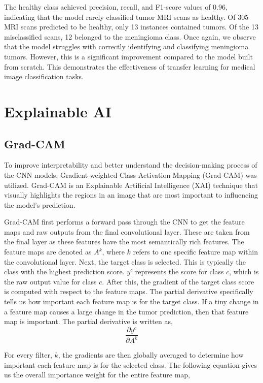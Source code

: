 \documentclass[conference]{IEEEtran}
\begin{document}
The healthy class achieved precision, recall, and F1-score values of 0.96, indicating that the model rarely classified tumor MRI scans as healthy. Of 305 MRI scans predicted to be healthy, only 13 instances contained tumors. Of the 13 misclassified scans, 12 belonged to the meningioma class. Once again, we observe that the model struggles with correctly identifying and classifying meningioma tumors. However, this is a significant improvement compared to the model built from scratch. This demonstrates the effectiveness of transfer learning for medical image classification tasks.

\section{Explainable AI}

\subsection{Grad-CAM}

To improve interpretability and better understand the decision-making process of the CNN models, Gradient-weighted Class Activation Mapping (Grad-CAM) was utilized. Grad-CAM is an Explainable Artificial Intelligence (XAI) technique that visually highlights the regions in an image that are most important to influencing the model's prediction.

Grad-CAM first performs a forward pass through the CNN to get the feature maps and raw outputs from the final convolutional layer. These are taken from the final layer as these features have the most semantically rich features. The feature maps are denoted as $A^k$, where $k$ refers to one specific feature map within the convolutional layer. Next, the target class is selected. This is typically the class with the highest prediction score. $y^c$ represents the score for class $c$, which is the raw output value for class $c$. After this, the gradient of the target class score is computed with respect to the feature maps. The partial derivative specifically tells us how important each feature map is for the target class. If a tiny change in a feature map causes a large change in the tumor prediction, then that feature map is important. The partial derivative is written as,
\[
\frac{\partial y^c}{\partial A^k}
\]

For every filter, $k$, the gradients are then globally averaged to determine how important each feature map is for the selected class. The following equation gives us the overall importance weight for the entire feature map,
\end{document}
